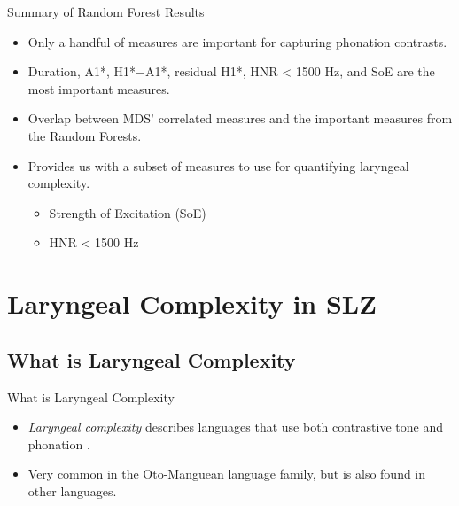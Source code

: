\documentclass[professionalfonts]{beamer}
\begin{document}
\begin{frame}{Summary of Random Forest Results}
  \begin{itemize}
    \item Only a handful of measures are important for capturing phonation contrasts.
    \item Duration, A1*, H1*$-$A1*, residual H1*, HNR < 1500 Hz, and SoE are the most important measures.
    \item Overlap between MDS' correlated measures and the important measures from the Random Forests.
    \item Provides us with a subset of measures to use for quantifying laryngeal complexity.
    \begin{itemize}
      \item Strength of Excitation (SoE)
      \item HNR < 1500 Hz
    \end{itemize}
  \end{itemize}
\end{frame}

\section{Laryngeal Complexity in SLZ}

\subsection{What is Laryngeal Complexity}

\begin{frame}{What is Laryngeal Complexity}
  \begin{itemize}
    \item \textit{Laryngeal complexity} describes languages that use both contrastive tone and phonation \citep{silvermanLaryngealComplexityOtomanguean1997,silvermanPhasingRecoverability1997}.
    \item Very common in the Oto-Manguean language family, but is also found in other languages.
  \end{itemize}
\end{frame}
\end{document}
